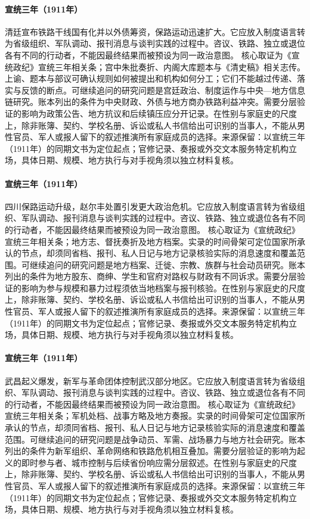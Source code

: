 \hypertarget{public:EQ-1911-RAILWAY-NATIONALIZATION}{}\paragraph{宣统三年（1911年）}清廷宣布铁路干线国有化并以外债筹资，保路运动迅速扩大。它应放入制度语言转为省级组织、军队调动、报刊消息与谈判实践的过程中。咨议、铁路、独立或退位各有不同的行动者，不能因最终结果而被预设为同一政治意图。 核心取证为《宣统政纪》宣统三年相关条；宫中朱批奏折、内阁大库题本与《清史稿》相关志传。上谕、题本与部议可确认规则如何被提出和机构如何分工；它们不能越过传递、落实与反馈的断点。可继续追问的研究问题是宫廷政治、制度运作与中央—地方信息链研究。账本列出的条件为中央财政、外债与地方商办铁路利益冲突。需要分层验证的影响为政策公告、地方抗议和后续镇压应分开记录。在性别与家庭史的尺度上，除非账簿、契约、学校名册、诉讼或私人书信给出可识别的当事人，不能从男性官员、军人或报人留下的叙述推演所有家庭成员的选择。来源保留：以宣统三年（1911年）的同期文书为定位起点；官修记录、奏报或外交文本服务特定机构立场，具体日期、规模、地方执行与对手视角须以独立材料复核。
\hypertarget{public:EQ-1911-SICHUAN-RAILWAY-PROTEST}{}\paragraph{宣统三年（1911年）}四川保路运动升级，赵尔丰处置引发更大政治危机。它应放入制度语言转为省级组织、军队调动、报刊消息与谈判实践的过程中。咨议、铁路、独立或退位各有不同的行动者，不能因最终结果而被预设为同一政治意图。 核心取证为《宣统政纪》宣统三年相关条；地方志、督抚奏折及地方档案。实录的时间骨架可定位国家所承认的节点，却须同省档、报刊、私人日记与地方记录核验实际的消息速度和覆盖范围。可继续追问的研究问题是地方档案、迁徙、宗教、族群与社会动员研究。账本列出的条件为地方股东、商绅、学生和官府对路权与财政有不同诉求。需要分层验证的影响为参与规模和暴力过程须依当地档案与报刊核验。在性别与家庭史的尺度上，除非账簿、契约、学校名册、诉讼或私人书信给出可识别的当事人，不能从男性官员、军人或报人留下的叙述推演所有家庭成员的选择。来源保留：以宣统三年（1911年）的同期文书为定位起点；官修记录、奏报或外交文本服务特定机构立场，具体日期、规模、地方执行与对手视角须以独立材料复核。
\hypertarget{public:EQ-1911-WUCHANG-UPRISING}{}\paragraph{宣统三年（1911年）}武昌起义爆发，新军与革命团体控制武汉部分地区。它应放入制度语言转为省级组织、军队调动、报刊消息与谈判实践的过程中。咨议、铁路、独立或退位各有不同的行动者，不能因最终结果而被预设为同一政治意图。 核心取证为《宣统政纪》宣统三年相关条；军机处档、战事方略及地方奏报。实录的时间骨架可定位国家所承认的节点，却须同省档、报刊、私人日记与地方记录核验实际的消息速度和覆盖范围。可继续追问的研究问题是战争动员、军需、战场暴力与地方社会研究。账本列出的条件为新军组织、革命网络和铁路危机相互叠加。需要分层验证的影响为起义的即时参与者、城市控制与后续省份响应需分层叙述。在性别与家庭史的尺度上，除非账簿、契约、学校名册、诉讼或私人书信给出可识别的当事人，不能从男性官员、军人或报人留下的叙述推演所有家庭成员的选择。来源保留：以宣统三年（1911年）的同期文书为定位起点；官修记录、奏报或外交文本服务特定机构立场，具体日期、规模、地方执行与对手视角须以独立材料复核。
